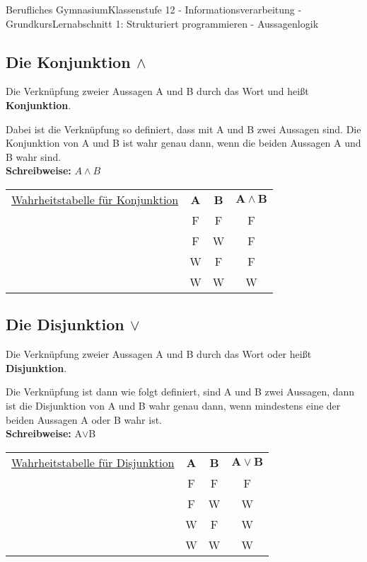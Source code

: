 \documentclass[11pt,oneside,openany,headings=optiontotoc,11pt,numbers=noenddot]{article}
\begin{document}
\begin{worksheet}{Berufliches Gymnasium}{Klassenstufe 12 - Informationsverarbeitung - Grundkurs}{Lernabschnitt 1: Strukturiert programmieren - Aussagenlogik}
		\subsection{Die Konjunktion \grqq{}$\wedge$\grqq{}}
		Die Verknüpfung zweier Aussagen A und B durch das Wort \grqq{}und\grqq{} heißt \textbf{Konjunktion}.
		\begin{framed}
			\noindent
			Dabei ist die Verknüpfung so definiert, dass mit A und B zwei Aussagen sind. Die Konjunktion von A und B ist wahr genau dann, wenn die beiden Aussagen A und B wahr sind.\\
			\textbf{Schreibweise:} \(A\wedge{}B\)
		\end{framed}
		\par\noindent
		\begin{tabularx}{\textwidth}{l|c|c|c|}
			\cline{2-4}
			\underline{Wahrheitstabelle für Konjunktion} & \textbf{A} & \textbf{B} & \(\mathbf{A\wedge{}B}\)\\
			\cline{2-4}
			& F & F & F\\
			\cline{2-4}
			& F & W & F\\
			\cline{2-4}
			& W & F & F\\
			\cline{2-4}
			& W & W & W\\
			\cline{2-4}
		\end{tabularx}
		\subsection{Die Disjunktion \grqq{}$\vee$\grqq{}}
		Die Verknüpfung zweier Aussagen A und B durch das Wort \grqq{}oder\grqq{} heißt \textbf{Disjunktion}.
		\begin{framed}
			\noindent
			Die Verknüpfung ist dann wie folgt definiert, sind A und B zwei Aussagen, dann ist die Disjunktion von A und B wahr genau dann, wenn mindestens eine der beiden Aussagen A oder B wahr ist.\\
			\textbf{Schreibweise:} A$\vee$B
		\end{framed}
		\par\noindent
		\begin{tabularx}{\textwidth}{l|c|c|c|}
			\cline{2-4}
			\underline{Wahrheitstabelle für Disjunktion} & \textbf{A} & \textbf{B} & \(\mathbf{A\vee{}B}\)\\
			\cline{2-4}
			& F & F & F\\
			\cline{2-4}
			& F & W & W\\
			\cline{2-4}
			& W & F & W\\
			\cline{2-4}
			& W & W & W\\
			\cline{2-4}
		\end{tabularx}

\end{worksheet}
\end{document}

